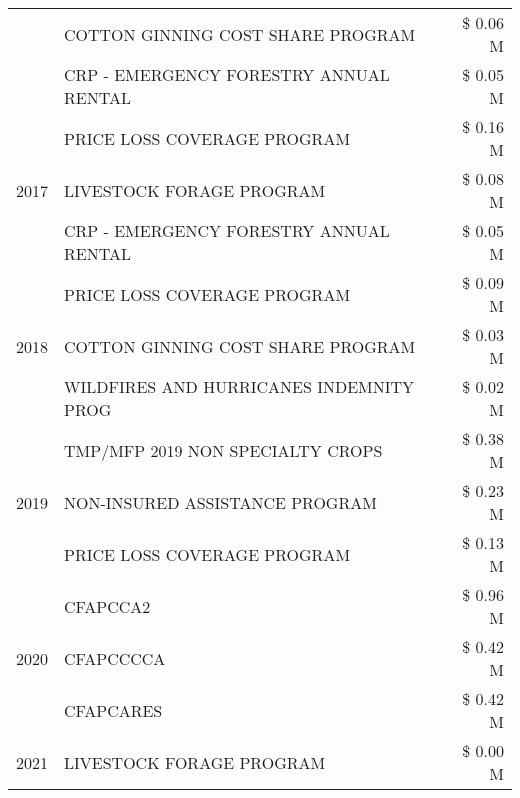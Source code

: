 \begin{tabular}{llr}
 & COTTON GINNING COST SHARE PROGRAM & \$ 0.06 M \\
 & CRP - EMERGENCY FORESTRY ANNUAL RENTAL & \$ 0.05 M \\
\cline{1-3}
\multirow[t]{3}{*}{2017} & PRICE LOSS COVERAGE PROGRAM & \$ 0.16 M \\
 & LIVESTOCK FORAGE PROGRAM & \$ 0.08 M \\
 & CRP - EMERGENCY FORESTRY ANNUAL RENTAL & \$ 0.05 M \\
\cline{1-3}
\multirow[t]{3}{*}{2018} & PRICE LOSS COVERAGE PROGRAM & \$ 0.09 M \\
 & COTTON GINNING COST SHARE PROGRAM & \$ 0.03 M \\
 & WILDFIRES AND HURRICANES INDEMNITY PROG & \$ 0.02 M \\
\cline{1-3}
\multirow[t]{3}{*}{2019} & TMP/MFP 2019 NON SPECIALTY CROPS & \$ 0.38 M \\
 & NON-INSURED ASSISTANCE PROGRAM & \$ 0.23 M \\
 & PRICE LOSS COVERAGE PROGRAM & \$ 0.13 M \\
\cline{1-3}
\multirow[t]{3}{*}{2020} & CFAPCCA2 & \$ 0.96 M \\
 & CFAPCCCCA & \$ 0.42 M \\
 & CFAPCARES & \$ 0.42 M \\
\cline{1-3}
2021 & LIVESTOCK FORAGE PROGRAM & \$ 0.00 M \\
\cline{1-3}
\bottomrule
\end{tabular}
